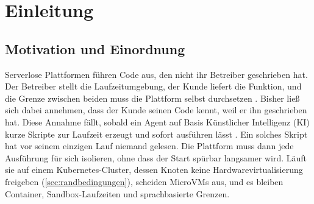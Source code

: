 \section{Einleitung}
\label{sec:Einleitung}


\subsection{Motivation und Einordnung}
\label{sec:einleitung:motivation}

Serverlose Plattformen führen Code aus, den nicht ihr Betreiber geschrieben hat. Der Betreiber
stellt die Laufzeitumgebung, der Kunde liefert die Funktion, und die Grenze zwischen beiden muss
die Plattform selbst durchsetzen \autocite[S.~419]{agache_firecracker_2020}. Bisher ließ sich dabei annehmen, dass
der Kunde seinen Code kennt, weil er ihn geschrieben hat. Diese Annahme fällt, sobald ein Agent auf Basis Künstlicher Intelligenz (\acs{KI}) kurze Skripte zur
Laufzeit erzeugt und sofort ausführen lässt \autocite[S.~50208]{wang_executable_2024}. Ein solches Skript hat vor
seinem einzigen Lauf niemand gelesen. Die Plattform muss dann jede Ausführung für sich isolieren, ohne dass der Start
spürbar langsamer wird. Läuft sie auf einem Kubernetes-Cluster, dessen Knoten keine Hardwarevirtualisierung freigeben
(\autoref{sec:randbedingungen}), scheiden MicroVMs aus, und es bleiben Container, Sandbox-Laufzeiten und sprachbasierte
Grenzen.


